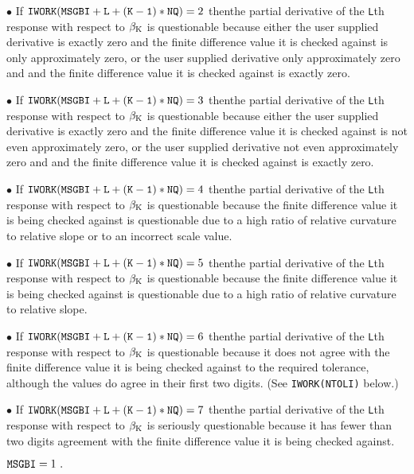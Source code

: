 {\item{$\bullet$} If ${\tt IWORK(MSGBI+L+(K-1)*NQ)} = 2$ then\hfil\break the partial derivative of the {\tt L}th response with respect to $\beta_{\rm K}$ is
questionable because either the user supplied derivative is exactly zero and the finite difference value it is checked against is only approximately zero, or the user supplied derivative only approximately zero and and the finite difference value it is checked against is exactly zero.

\item{$\bullet$} If ${\tt IWORK(MSGBI+L+(K-1)*NQ)} = 3$ then\hfil\break the partial derivative of the {\tt L}th response with respect to $\beta_{\rm K}$ is questionable because either the user supplied derivative is exactly zero and the finite difference value it is checked against is not even approximately zero, or the user supplied derivative not even approximately zero and and the finite difference value it is checked against is exactly zero.

\item{$\bullet$} If ${\tt IWORK(MSGBI+L+(K-1)*NQ)} = 4$ then\hfil\break the partial derivative of the {\tt L}th response with respect to $\beta_{\rm K}$ is questionable because the finite difference value it is being checked against is questionable due to a high ratio of relative curvature to relative slope or to an incorrect scale value.

\item{$\bullet$} If ${\tt IWORK(MSGBI+L+(K-1)*NQ)} = 5$ then\hfil\break the partial derivative of the {\tt L}th response with respect to $\beta_{\rm K}$ is questionable because the finite difference value it is being checked against is questionable due to a high ratio of relative curvature to relative slope.

\item{$\bullet$} If ${\tt IWORK(MSGBI+L+(K-1)*NQ)} = 6$ then\hfil\break the partial derivative of the {\tt L}th response with respect to $\beta_{\rm K}$ is questionable because it does not agree with the finite difference value it is being checked against to the required tolerance, although the values do agree in their first two digits. (See {\tt IWORK(NTOLI)} below.)

\item{$\bullet$} If ${\tt IWORK(MSGBI+L+(K-1)*NQ)} = 7$ then\hfil\break the partial derivative of the {\tt L}th response with respect to $\beta_{\rm K}$ is seriously questionable because it has fewer than two digits agreement with the finite difference value it is being checked against.

\aligntobox ${\tt MSGBI} = 1\ .$}\bigskip

